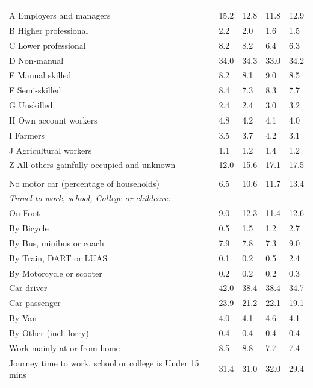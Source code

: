 \documentclass{article}
\begin{document}
\begin{table}[h]
\begin{tabular}{KTTTT}
\hline
    \\ 
    \hline
A Employers and managers & 15.2& 12.8& 11.8& 12.9\\
B Higher professional & 2.2& 2.0& 1.6& 1.5\\
C Lower professional & 8.2& 8.2& 6.4& 6.3\\
D Non-manual & 34.0& 34.3& 33.0& 34.2\\
E Manual skilled & 8.2& 8.1& 9.0& 8.5\\
F Semi-skilled & 8.4& 7.3& 8.3& 7.7\\
G Unskilled & 2.4& 2.4& 3.0& 3.2\\
H Own account workers & 4.8& 4.2& 4.1& 4.0\\
I Farmers & 3.5& 3.7& 4.2& 3.1\\
J Agricultural workers & 1.1& 1.2& 1.4& 1.2\\
Z All others gainfully occupied and unknown & 12.0& 15.6& 17.1& 17.5\\
\hline
{}\hline
    \\ 
    \hline
No motor car (percentage of households) &  6.5& 10.6& 11.7& 
13.4\\
    \hline 
\emph{Travel to work, school, College or childcare:} & & & \\
\quad On Foot &  9.0& 12.3& 11.4& 12.6\\ 
\quad By Bicycle & 0.5& 1.5& 1.2& 2.7\\ 
\quad By Bus, minibus or coach & 7.9& 7.8& 7.3& 9.0\\
\quad By Train, DART or LUAS & 0.1& 0.2& 0.5& 2.4\\
\quad By Motorcycle or scooter & 0.2& 0.2& 0.2& 0.3\\
\quad Car driver & 42.0 & 38.4& 38.4& 34.7\\
\quad Car passenger & 23.9& 21.2& 22.1& 19.1\\
\quad By Van & 4.0& 4.1& 4.6& 4.1\\
\quad By Other (incl. lorry) & 0.4& 0.4& 0.4& 0.4\\
    \hline
Work mainly at or from home & 8.5& 8.8& 7.7& 7.4\\
Journey time to work, school or college is Under 15 mins & 31.4& 31.0& 32.0& 29.4\\

\end{tabular}
\end{table}
\end{document}
